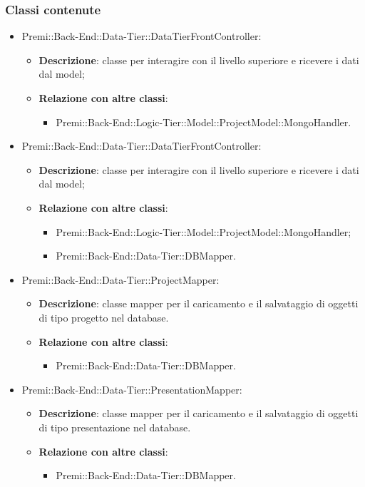 		\subsubsection*{Classi contenute}
		\begin{itemize}
			\item Premi::Back-End::Data-Tier::DataTierFrontController:
				\begin{itemize}
					\item \textbf{Descrizione}: classe per interagire con il livello superiore e ricevere i dati dal model;
					\item \textbf{Relazione con altre classi}:
					\begin{itemize}
						\item Premi::Back-End::Logic-Tier::Model::ProjectModel::MongoHandler.
					\end{itemize}
				\end{itemize}
			
			\item Premi::Back-End::Data-Tier::DataTierFrontController:
				\begin{itemize}
					\item \textbf{Descrizione}: classe per interagire con il livello superiore e ricevere i dati dal model;
					\item \textbf{Relazione con altre classi}:
					\begin{itemize}
						\item Premi::Back-End::Logic-Tier::Model::ProjectModel::MongoHandler;
						\item Premi::Back-End::Data-Tier::DBMapper.
					\end{itemize}
				\end{itemize}
				
			\item Premi::Back-End::Data-Tier::ProjectMapper:
			\begin{itemize}
				\item \textbf{Descrizione}: classe mapper per il caricamento e il salvataggio di oggetti di tipo progetto nel \gls{database}.
				\item \textbf{Relazione con altre classi}:
				\begin{itemize}
					\item Premi::Back-End::Data-Tier::DBMapper.
				\end{itemize}
			\end{itemize}
				
			\item Premi::Back-End::Data-Tier::PresentationMapper:
			\begin{itemize}
				\item \textbf{Descrizione}: classe mapper per il caricamento e il salvataggio di oggetti di tipo presentazione nel \gls{database}.
				\item \textbf{Relazione con altre classi}:
				\begin{itemize}
					\item Premi::Back-End::Data-Tier::DBMapper.
				\end{itemize}
			\end{itemize}
			

\end{itemize}
